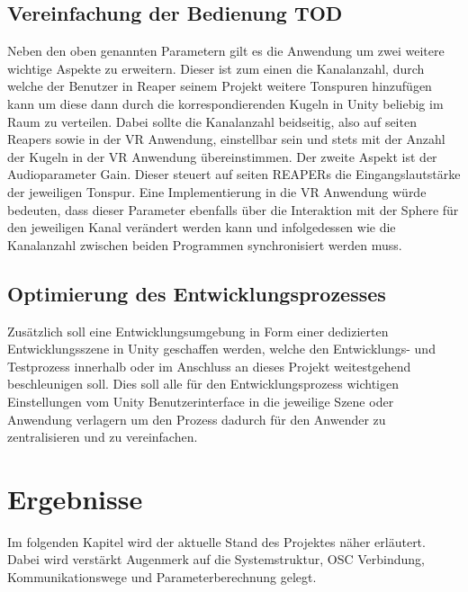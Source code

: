 \documentclass[11pt, titlepage, fleqn]{report}
\begin{document}
            \subsection*{Vereinfachung der Bedienung TOD}%
                Neben den oben genannten Parametern gilt es die Anwendung um zwei weitere wichtige Aspekte zu erweitern. Dieser ist zum 
                einen die Kanalanzahl, durch welche der Benutzer in Reaper seinem Projekt weitere Tonspuren hinzufügen kann um diese 
                dann durch die korrespondierenden Kugeln in Unity beliebig im Raum zu verteilen. Dabei sollte die Kanalanzahl 
                beidseitig, also auf seiten Reapers sowie in der VR Anwendung, einstellbar sein und stets mit der Anzahl der Kugeln 
                in der VR Anwendung übereinstimmen.
                Der zweite Aspekt ist der Audioparameter Gain. Dieser steuert auf seiten REAPERs die Eingangslautstärke der jeweiligen 
                Tonspur. Eine Implementierung in die VR Anwendung würde bedeuten, dass dieser Parameter ebenfalls über die Interaktion 
                mit der Sphere für den jeweiligen Kanal verändert werden kann und infolgedessen wie die Kanalanzahl zwischen beiden 
                Programmen synchronisiert werden muss.
            \subsection*{Optimierung des Entwicklungsprozesses}
                Zusätzlich soll eine Entwicklungsumgebung in Form einer dedizierten Entwicklungsszene in Unity geschaffen werden, 
                welche den Entwicklungs- und Testprozess innerhalb oder im Anschluss an dieses Projekt weitestgehend beschleunigen 
                soll. Dies soll alle für den Entwicklungsprozess wichtigen Einstellungen vom Unity Benutzerinterface in die 
                jeweilige Szene oder Anwendung verlagern um den Prozess dadurch für den Anwender zu zentralisieren und zu 
                vereinfachen.
        \newpage
        \section{Ergebnisse}
            Im folgenden Kapitel wird der aktuelle Stand des Projektes näher erläutert. Dabei wird verstärkt Augenmerk auf die 
            Systemstruktur, OSC Verbindung, Kommunikationswege und Parameterberechnung gelegt.
        \label{sec:3.2}
\end{document}
